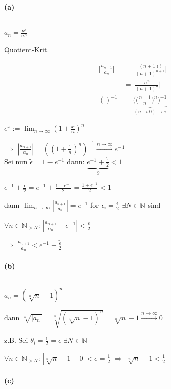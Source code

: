 \paragraph{(a)}
$ $\newline

$a_n=\frac{n!}{n^n}$

Quotient-Krit.

\begin{align*}
\Big|\frac{a_{n+1}}{a_n}\Big|
&=\Big|\frac{(n+1)!}{(n+1)^{n+1}}\Big|\\
&=\Big|\frac{n^n}{(n+1)^n}\Big|\\
()^{-1}&=\underset{(n\rightarrow0)\rightarrow e}{\underbrace{\Bigg(\Big(\frac{n+1}{n}\Big)^n\Bigg)^{-1}}}
\end{align*}

$e^x:=\lim_{n\rightarrow\infty}(1+\frac{x}{n})^n$

$\Rightarrow$ $|\frac{a_{n+1}}{a_n}|=((1+\frac{1}{n})^n)^{-1}\overset{n\rightarrow\infty}{\longrightarrow}e^{-1}$\\

Sei nun $\tilde{\epsilon}=1-e^{-1}$ dann: $\underset{\theta}{\underbrace{e^{-1}+\frac{\tilde{\epsilon}}{2}}}<1$

$e^{-1}+\frac{\tilde{\epsilon}}{2}=e^{-1}+\frac{1-e^{-1}}{2}=\frac{1+e^{-1}}{2}<1$

dann $\lim_{n\rightarrow\infty}|\frac{a_{n+1}}{a_n}|=e^{-1}$ for $\epsilon_i=\frac{\tilde{\epsilon}}{2}$ $\exists N\in\mathbb{N}$ sind

$\forall n\in\mathbb{N}_{>N}$: $|\frac{a_{n+1}}{a_n}-e^{-1}|<\frac{\tilde{\epsilon}}{2}$

$\Rightarrow$ $\frac{a_{n+1}}{a_n}<e^{-1}+\frac{\tilde{\epsilon}}{2}$

\paragraph{(b)}
$ $\newline

$a_n=(\sqrt[n]{n}-1)^n$

dann $\sqrt[n]{|a_n|}=\sqrt[n]{(\sqrt[n]{n}-1)^n}=\sqrt[n]{n}-1\overset{n\rightarrow\infty}{\longrightarrow}0$

z.B. Sei $\theta_i=\frac{1}{2}=\epsilon$ $\exists N\in\mathbb{N}$

$\forall n\in\mathbb{N}_{>N}$: $|\sqrt[n]{n}-1-0|<\epsilon=\frac{1}{2}$ $\Rightarrow$ $\sqrt[n]{n}-1<\frac{1}{2}$

\paragraph{(c)}
$ $\newline

